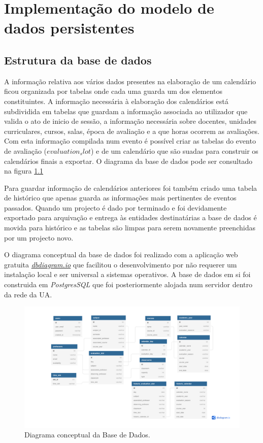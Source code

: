 \documentclass[11pt, twoside]{report}
\begin{document}
	\chapter{Implementação do modelo de dados persistentes}
	\section{Estrutura da base de dados}
	A informação relativa aos vários dados presentes na elaboração de um calendário ficou organizada por tabelas onde cada uma guarda um dos elementos constituintes.
	A informação necessária à elaboração dos calendários está subdividida em tabelas que guardam a informação associada ao utilizador que valida o ato de inicio de sessão, a informação necessária sobre docentes, unidades curriculares, cursos, salas, época de avaliação e a que horas ocorrem as avaliações.
	Com esta informação compilada num evento é possível criar as tabelas do evento de avaliação (\textit{$ evaluation_slot $}) e de um calendário que são suadas para construir os calendários finais a exportar.
	O diagrama da base de dados pode ser consultado na figura \ref{fig:calendariodb}
	
	Para guardar informação de calendários anteriores foi também criado uma tabela de histórico que apenas guarda as informações mais pertinentes de eventos passados.
	Quando um projecto é dado por terminado e foi devidamente exportado para arquivação e entrega às entidades destinatárias a base de dados é movida para histórico e as tabelas são limpas para serem novamente preenchidas por um projecto novo.
	
	O diagrama conceptual da base de dados foi realizado com a aplicação web gratuita \href{https://dbdiagram.io/}{\textit{dbdiagram.io}} que facilitou o desenvolvimento por não requerer um instalação local e ser universal a sistemas operativos.
	A base de dados em si foi construida em \textit{PostgresSQL} que foi posteriormente alojada num servidor dentro da rede da UA.
	
	\begin{figure}[H]
		\centering
		\includegraphics[width=0.95\linewidth]{image/Calendario_DB}
		\caption{Diagrama conceptual da Base de Dados.}
		\label{fig:calendariodb}
	\end{figure}
	
\end{document}
